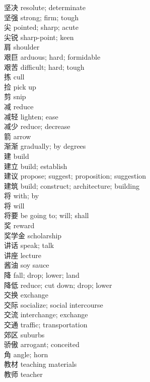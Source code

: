 坚决 \quad resolute; determinate\\
坚强 \quad strong; firm; tough\\
尖 \quad pointed; sharp; acute\\
尖锐 \quad sharp-point; keen\\
肩 \quad shoulder\\
艰巨 \quad arduous; hard; formidable\\
艰苦 \quad difficult; hard; tough\\
拣 \quad cull\\
捡 \quad pick up\\
剪 \quad snip\\
减 \quad reduce\\
减轻 \quad lighten; ease\\
减少 \quad reduce; decrease\\
箭 \quad arrow\\
渐渐 \quad gradually; by degrees\\
建 \quad build\\
建立 \quad build; establish\\
建议 \quad propose; suggest; proposition; suggestion\\
建筑 \quad build; construct; architecture; building\\
将 \quad with; by\\
将 \quad will\\
将要 \quad be going to; will; shall\\
奖 \quad reward\\
奖学金 \quad scholarship\\
讲话 \quad speak; talk\\
讲座 \quad lecture\\
酱油 \quad soy sauce\\
降 \quad fall; drop; lower; land\\
降低 \quad reduce; cut down; drop; lower\\
交换 \quad exchange\\
交际 \quad socialize; social intercourse\\
交流 \quad interchange; exchange\\
交通 \quad traffic; transportation\\
郊区 \quad suburbs\\
骄傲 \quad arrogant; conceited\\
角 \quad angle; horn\\
教材 \quad teaching materials\\
教师 \quad teacher\\
